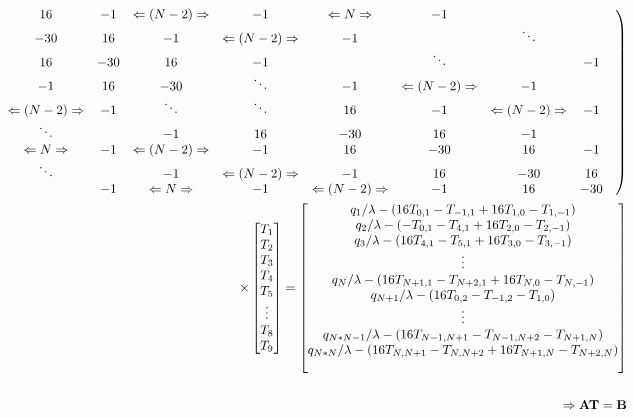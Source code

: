 \documentclass[12pt]{amsart}   %
\begin{document}
\begin{eqnarray}
\hspace{-4.5cm}
 \begin{pmatrix}
-30 & 16 & -1&\Leftarrow (N-2)\Rightarrow &-1&\Leftarrow N\Rightarrow&-1&&\\
16&-30 & 16 & -1&\Leftarrow (N-2)\Rightarrow &-1&&\ddots&\\
-1&16& -30 & 16 & -1&&\ddots&&-1\\
&-1&16&-30 & \ddots & -1&\Leftarrow (N-2)\Rightarrow& -1&&\\
-1&\Leftarrow (N-2)\Rightarrow&-1&\ddots& \ddots & 16&-1&\Leftarrow (N-2)\Rightarrow &-1\\
&\ddots&&-1&16&  -30 & 16 &-1&\\
-1&\Leftarrow N\Rightarrow&-1&\Leftarrow (N-2)\Rightarrow&-1&16&  -30 &16& -1 \\
&\ddots&&-1&\Leftarrow (N-2)\Rightarrow&-1&16&  -30 &16\\
&&-1&\Leftarrow N\Rightarrow&-1&\Leftarrow (N-2)\Rightarrow&-1&16&  -30 \\
\end{pmatrix}  \nonumber\\ \times \begin{bmatrix}
T_{1}\\
T_{2}\\
T_{3}\\
T_{4}\\
T_{5}\\
\vdots\\
T_{8}\\
T_{9}\\
\end{bmatrix} = 
\begin{bmatrix}
{q_{1}}/{\lambda}-(16T_{0,1}-T_{-1,1}+16T_{1,0}-T_{1,-1})\\
{q_{2}}/{\lambda}-(-T_{0,1}-T_{4,1}+16T_{2,0}-T_{2,-1})\\
{q_{3}}/{\lambda}-(16T_{4,1}-T_{5,1}+16T_{3,0}-T_{3,-1})\\
\vdots\\
{q_{N}}/{\lambda}-(16T_{N+1,1}-T_{N+2,1}+16T_{N,0}-T_{N,-1})\\
{q_{N+1}}/{\lambda}-(16T_{0,2}-T_{-1,2}-T_{1,0})\\
\vdots\\
{q_{N*N-1}}/{\lambda}-(16T_{N-1,N+1}-T_{N-1,N+2}-T_{N+1,N})\\
{q_{N*N}}/{\lambda}-(16T_{N,N+1}-T_{N,N+2}+16T_{N+1,N}-T_{N+2,N}) \nonumber\\ \\
\end{bmatrix} \\ \\ \hspace{-5cm}\Rightarrow \textbf{AT}=\textbf{B}
\end{eqnarray}
\end{document}
